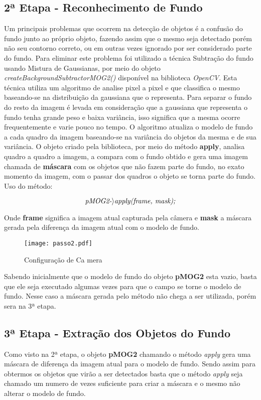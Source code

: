	\subsection{2ª Etapa - Reconhecimento de Fundo}
	Um principais problemas que ocorrem na detecção de objetos é a confusão do fundo junto ao próprio objeto, fazendo assim que o mesmo seja detectado porém não seu contorno correto, ou em outras vezes ignorado por ser considerado parte do fundo. Para eliminar este problema foi utilizado a técnica  Subtração do fundo usando Mistura de Gaussianas, por meio do objeto \textit{createBackgroundSubtractorMOG2()} disponível na biblioteca \textit{OpenCV}. Esta técnica utiliza um algoritmo de analise pixel a pixel e que classifica o mesmo baseando-se na distribuição da gaussiana que o representa. Para separar o fundo do resto da imagem é levada em consideração que a gaussiana que representa o fundo tenha grande peso e baixa variância, isso significa que a mesma ocorre frequentemente e varie pouco no tempo. O algoritmo atualiza o modelo de fundo a cada quadro da imagem baseando-se na variância do objetos da mesma e de sua variância. O objeto criado pela biblioteca, por meio do método \textbf{apply}, analisa quadro a quadro a imagem, a compara com o fundo obtido e gera uma imagem chamada de \textbf{máscara} com os objetos que não fazem parte do fundo, no exato momento da imagem, com o passar dos quadros o objeto se torna parte do fundo. Uso do método:
\begin{center}
 \begin{displaymath}  \centering \textit{pMOG2-$\rangle$apply(frame, mask);}  \end{displaymath}

\end{center}

Onde \textbf{frame} significa a imagem atual capturada pela câmera e \textbf{mask} a máscara gerada pela diferença da imagem atual com o modelo de fundo. 

\begin{figure}[H]
			\centering
			\texttt{[image: passo2.pdf]}
			\caption{Configuração de Ca mera}
			\label{Configuracao}
		\end{figure}		


Sabendo inicialmente que o modelo de fundo do objeto \textbf{pMOG2} esta vazio, basta que ele seja executado algumas vezes para que o campo se torne o modelo de fundo. Nesse caso a máscara gerada pelo método não chega a ser utilizada, porém sera na 3ª etapa.
	\subsection{3ª Etapa - Extração dos Objetos do Fundo}
	Como visto na 2ª etapa, o objeto \textbf{pMOG2} chamando o método \textit{apply} gera uma máscara de diferença da imagem atual para o modelo de fundo. Sendo assim para obtermos os objetos que virão a ser detectados basta que o método \textit{apply} seja chamado um numero de vezes suficiente para criar a máscara e o mesmo não alterar o modelo de fundo.
	
